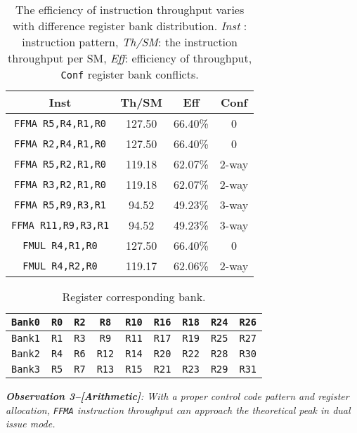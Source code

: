\begin{table}[htbp]
    \caption{The efficiency of instruction throughput varies with difference register bank distribution. {\it Inst} : 
instruction pattern, {\it Th/SM}: the instruction throughput per SM, {\it Eff}: efficiency of throughput, {\tt Conf} 
register bank conflicts.}
\centering
\scalebox{1.0} {
\begin{tabular}{|c|c|c|c|}
\hline
Inst &Th/SM&Eff&Conf\\
\hline
{\tt FFMA R5,R4,R1,R0}&127.50&66.40\%&0\\
\hline
{\tt FFMA R2,R4,R1,R0}&127.50&66.40\%&0\\
\hline
{\tt FFMA R5,R2,R1,R0}&119.18&62.07\%&2-way\\
\hline
{\tt FFMA R3,R2,R1,R0}&119.18&62.07\%&2-way\\
\hline
{\tt FFMA R5,R9,R3,R1}&94.52&49.23\%&3-way\\
\hline
{\tt FFMA R11,R9,R3,R1}&94.52&49.23\%&3-way\\
\hline
{\tt FMUL R4,R1,R0}&127.50&66.40\%&0\\
\hline
{\tt FMUL R4,R2,R0}&119.17&62.06\%&2-way\\
\hline
\end{tabular}
}
\label{tab:th}
\end{table}


\begin{table}[htbp]
\caption{Register corresponding bank.}
\centering
\scalebox{1.0} {
\begin{tabular}{|c|c|c|c|c|c|c|c|c|}
\hline
    {\tt Bank0}&{\tt R0}&{\tt R2}&{\tt R8}&{\tt R10}&{\tt R16}&{\tt R18}&{\tt R24}&{\tt R26}\\
\hline
    {\tt Bank1}&{\tt R1}&{\tt R3}&{\tt R9}&{\tt R11}&{\tt R17}&{\tt R19}&{\tt R25}&{\tt R27} \\
\hline
    {\tt Bank2}&{\tt R4}&{\tt R6}&{\tt R12}&{\tt R14}&{\tt R20}&{\tt R22}&{\tt R28}&{\tt R30}\\
\hline
    {\tt Bank3}&{\tt R5}&{\tt R7}&{\tt R13}&{\tt R15}&{\tt R21}&{\tt R23}&{\tt R29}&{\tt R31}\\
\hline
\end{tabular}
}
\label{tab:reg}
\end{table}

{\em {\bf Observation 3--[Arithmetic]}: With a proper control code pattern and register allocation, {\tt FFMA} 
instruction throughput can approach the theoretical peak in dual issue mode.}


